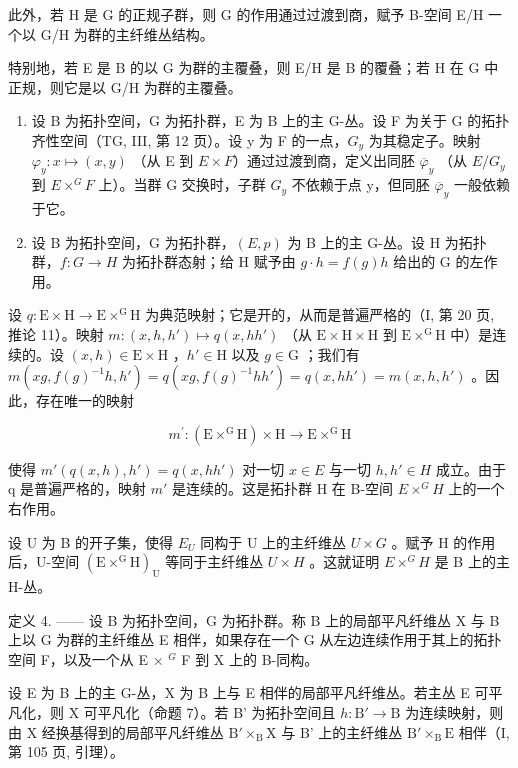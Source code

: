 此外，若 H 是 G 的正规子群，则 G 的作用通过过渡到商，赋予 B-空间 E/H 一个以 G/H 为群的主纤维丛结构。

特别地，若 E 是 B 的以 G 为群的主覆叠，则 E/H 是 B 的覆叠；若 H 在 G 中正规，则它是以 G/H 为群的主覆叠。

\begin{enumerate}
\def\labelenumi{\arabic{enumi})}
\setcounter{enumi}{4}
\item
  设 B 为拓扑空间，G 为拓扑群，E 为 B 上的主 G-丛。设 F 为关于 G 的拓扑齐性空间（TG, III, 第 12 页）。设 y 为 F 的一点，\(G_{y}\) 为其稳定子。映射 \(\varphi_{y}\colon x\mapsto(x,y)\) （从 E 到 \(E\times F\)）通过过渡到商，定义出同胚 \(\overline{\varphi}_{y}\) （从 \(E/G_{y}\) 到 \(E\times^{G}F\) 上）。当群 G 交换时，子群 \(G_{y}\) 不依赖于点 y，但同胚 \(\overline{\varphi}_{y}\) 一般依赖于它。
\item
  设 B 为拓扑空间，G 为拓扑群，\((E,p)\) 为 B 上的主 G-丛。设 H 为拓扑群，\(f:G\to H\) 为拓扑群态射；给 H 赋予由 \(g\cdot h=f(g)h\) 给出的 G 的左作用。
\end{enumerate}

设 \(q \colon \mathrm{E} \times \mathrm{H} \to \mathrm{E} \times^{\mathrm{G}} \mathrm{H}\) 为典范映射；它是开的，从而是普遍严格的（I, 第 20 页, 推论 11）。映射 \(m \colon (x, h, h') \mapsto q(x, hh')\) （从 \(\mathrm{E} \times \mathrm{H} \times \mathrm{H}\) 到 \(\mathrm{E} \times^{\mathrm{G}} \mathrm{H}\) 中）是连续的。设 \((x, h) \in \mathrm{E} \times \mathrm{H}\) ，\(h' \in \mathrm{H}\) 以及 \(g \in \mathrm{G}\) ；我们有 \(m(xg, f(g)^{-1}h, h') = q(xg, f(g)^{-1}hh') = q(x, hh') = m(x, h, h')\) 。因此，存在唯一的映射

\[
m ^ {\prime} \colon (\mathrm{E} \times^ {\mathrm{G}} \mathrm{H}) \times \mathrm{H} \rightarrow \mathrm{E} \times^ {\mathrm{G}} \mathrm{H}
\]

使得 \(m'(q(x,h),h') = q(x,hh')\) 对一切 \(x \in E\) 与一切 \(h, h' \in H\) 成立。由于 q 是普遍严格的，映射 \(m'\) 是连续的。这是拓扑群 H 在 B-空间 \(E \times^{G} H\) 上的一个右作用。

设 U 为 B 的开子集，使得 \(E_{U}\) 同构于 U 上的主纤维丛 \(U \times G\) 。赋予 H 的作用后，U-空间 \((\mathrm{E} \times^{\mathrm{G}}\mathrm{H})_{\mathrm{U}}\) 等同于主纤维丛 \(U \times H\) 。这就证明 \(E \times^{G}H\) 是 B 上的主 H-丛。

定义 4. —— 设 B 为拓扑空间，G 为拓扑群。称 B 上的局部平凡纤维丛 X 与 B 上以 G 为群的主纤维丛 E 相伴，如果存在一个 G 从左边连续作用于其上的拓扑空间 F，以及一个从 E × \(^{G}\) F 到 X 上的 B-同构。

设 E 为 B 上的主 G-丛，X 为 B 上与 E 相伴的局部平凡纤维丛。若主丛 E 可平凡化，则 X 可平凡化（命题 7）。若 B' 为拓扑空间且 \(h \colon \mathrm{B}' \to \mathrm{B}\) 为连续映射，则由 X 经换基得到的局部平凡纤维丛 \(\mathrm{B}' \times_{\mathrm{B}} \mathrm{X}\) 与 B' 上的主纤维丛 \(\mathrm{B}' \times_{\mathrm{B}} \mathrm{E}\) 相伴（I, 第 105 页, 引理）。

